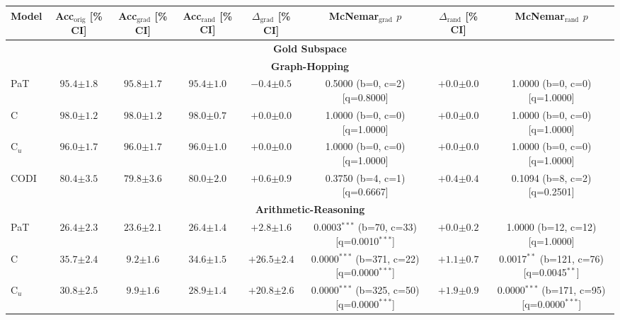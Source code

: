 \begin{table}[h!]
\centering
\tiny
\setlength{\tabcolsep}{3pt}
\begin{tabular}{l ccc cc cc}
\toprule
Model & Acc$_{\text{orig}}$ [\% CI] & Acc$_{\text{grad}}$ [\% CI] & Acc$_{\text{rand}}$ [\% CI] & $\Delta_{\text{grad}}$ [\% CI] & McNemar$_{\text{grad}}$ $p$ & $\Delta_{\text{rand}}$ [\% CI] & McNemar$_{\text{rand}}$ $p$ \\
\midrule
\multicolumn{8}{c}{\textbf{Gold Subspace}} \\
\midrule
\multicolumn{8}{c}{\textbf{Graph-Hopping}} \\
\midrule
PaT & $95.4 {\scriptstyle \pm 1.8}$ & $95.8 {\scriptstyle \pm 1.7}$ & $95.4 {\scriptstyle \pm 1.0}$ & $-0.4 {\scriptstyle \pm 0.5}$ & 0.5000 (b=0, c=2) [q=0.8000] & $+0.0 {\scriptstyle \pm 0.0}$ & 1.0000 (b=0, c=0) [q=1.0000] \\
C & $98.0 {\scriptstyle \pm 1.2}$ & $98.0 {\scriptstyle \pm 1.2}$ & $98.0 {\scriptstyle \pm 0.7}$ & $+0.0 {\scriptstyle \pm 0.0}$ & 1.0000 (b=0, c=0) [q=1.0000] & $+0.0 {\scriptstyle \pm 0.0}$ & 1.0000 (b=0, c=0) [q=1.0000] \\
C$_u$ & $96.0 {\scriptstyle \pm 1.7}$ & $96.0 {\scriptstyle \pm 1.7}$ & $96.0 {\scriptstyle \pm 1.0}$ & $+0.0 {\scriptstyle \pm 0.0}$ & 1.0000 (b=0, c=0) [q=1.0000] & $+0.0 {\scriptstyle \pm 0.0}$ & 1.0000 (b=0, c=0) [q=1.0000] \\
CODI & $80.4 {\scriptstyle \pm 3.5}$ & $79.8 {\scriptstyle \pm 3.6}$ & $80.0 {\scriptstyle \pm 2.0}$ & $+0.6 {\scriptstyle \pm 0.9}$ & 0.3750 (b=4, c=1) [q=0.6667] & $+0.4 {\scriptstyle \pm 0.4}$ & 0.1094 (b=8, c=2) [q=0.2501] \\
\midrule
\multicolumn{8}{c}{\textbf{Arithmetic-Reasoning}} \\
\midrule
PaT & $26.4 {\scriptstyle \pm 2.3}$ & $23.6 {\scriptstyle \pm 2.1}$ & $26.4 {\scriptstyle \pm 1.4}$ & $+2.8 {\scriptstyle \pm 1.6}$ & 0.0003$^{***}$ (b=70, c=33) [q=0.0010$^{***}$] & $+0.0 {\scriptstyle \pm 0.2}$ & 1.0000 (b=12, c=12) [q=1.0000] \\
C & $35.7 {\scriptstyle \pm 2.4}$ & $9.2 {\scriptstyle \pm 1.6}$ & $34.6 {\scriptstyle \pm 1.5}$ & $+26.5 {\scriptstyle \pm 2.4}$ & 0.0000$^{***}$ (b=371, c=22) [q=0.0000$^{***}$] & $+1.1 {\scriptstyle \pm 0.7}$ & 0.0017$^{**}$ (b=121, c=76) [q=0.0045$^{**}$] \\
C$_u$ & $30.8 {\scriptstyle \pm 2.5}$ & $9.9 {\scriptstyle \pm 1.6}$ & $28.9 {\scriptstyle \pm 1.4}$ & $+20.8 {\scriptstyle \pm 2.6}$ & 0.0000$^{***}$ (b=325, c=50) [q=0.0000$^{***}$] & $+1.9 {\scriptstyle \pm 0.9}$ & 0.0000$^{***}$ (b=171, c=95) [q=0.0000$^{***}$] \\

\end{tabular}
\end{table}
